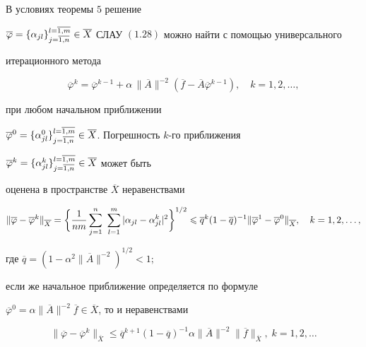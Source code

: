 \begin{thm}


В условиях теоремы $5$ решение 


$\overline{\varphi }=\{\alpha _{jl}\}_{j=\ol{1,n}}^{l=\ol{1,m}}\in


\overline{X}$ СЛАУ $(1.28)$ можно найти с помощью универсального


итерационного метода


\begin{equation}


\overline{\varphi }^k=\overline{\varphi }^{k-1}+\alpha \, \|\overline{A}\|^{-2}


(\overline{f}-\overline{A}\overline{\varphi }^{k-1}),\quad k=1,2,\dotsc,


\end{equation}


при любом начальном приближении 


$\overline{\varphi}^0=\{\alpha_{jl}^0\}_{j=\ol{1,n}}^{l=\ol{1,m}}


\in \overline{X}$. Погрешность $k$-го приближения


$\overline{\varphi }^k=\{\alpha _{jl}^k\}_{j=\ol{1,n}}^{l=\ol{1,m}}


\in \overline{X}$ может быть


оценена в пространстве $\overline{X}$ неравенствами


\begin{equation}


\|\overline{\varphi }-\overline{\varphi }^k\|_{\overline{X}}=


\bigg\{\frac{1}{nm}


\sum_{j=1}^n\ \sum_{l=1}^m|\alpha _{jl}-\alpha _{jl}^k|^2\bigg\}^{1/2}\lea


\overline{q}^k(1-\overline{q})^{-1} \|\overline{\varphi }^1-


\overline{\varphi }^0\|_{\overline{X}},


\quad k=1,2,\dotsc,


\end{equation}


где $\overline{q}=(1-\alpha ^2\|\overline{A}\|^{-2})^{1/2}<1;$


если же начальное  приближение определяется по формуле 


$\overline{\varphi }^0=\alpha \|\overline{A}\|^{-2}\overline{f}


\in \overline{X}$, то и неравенствами


\begin{equation}


\|\overline{\varphi }-\overline{\varphi }^k\|_{\overline{X}}


\leq \overline{q}^{k+1}(1-\overline{q})^{-1} \alpha


\|\overline{A}\|^{-2}\|\overline{f}\|_{\overline{X}},


\; k=1,2,\dotsc


\end{equation}


\end{thm}





